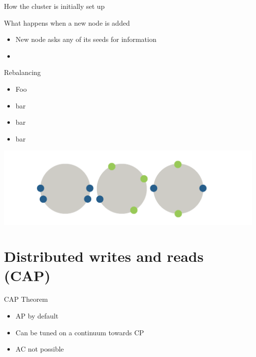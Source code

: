 \documentclass[
  10pt
]{beamer}
\begin{document}
\begin{frame}{How the cluster is initially set up}
\end{frame}

\begin{frame}{What happens when a new node is added}
  \begin{itemize}
    \item New node asks any of its seeds for information %
    \item
  \end{itemize}
\end{frame}

\begin{frame}{Rebalancing}
  \begin{itemize}
    \item Foo
    \item bar
    \item bar
    \item bar
  \end{itemize}
  \includegraphics[width=\textwidth]{resources/rebalancing.png}
\end{frame}

\section{Distributed writes and reads (CAP)}  %

\begin{frame}{CAP Theorem}
  \begin{itemize}
    \item AP by default
    \item Can be tuned on a continuum towards CP
    \item AC not possible  %
  \end{itemize}
\end{frame}
\end{document}
